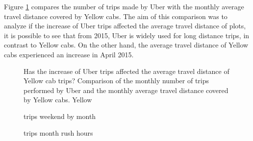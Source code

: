 Figure \ref{fig:boxDistances} compares the number of trips made by Uber with the monthly average travel distance covered by Yellow cabs. The aim of this comparison was to analyze if the increase of Uber trips affected the average travel distance of   plots, it is possible to see that from 2015, Uber is widely used for long distance trips, in contrast to Yellow cabs. On the other hand, the average travel distance of Yellow cabs experienced an increase in April 2015. 


\begin{figure}%
\centering
{}%
\qquad
{}%
\caption{Has the increase of Uber trips affected the average travel distance of Yellow cab trips? Comparison of the monthly number of trips performed by Uber and the monthly average travel distance covered by Yellow cabs. Yellow }
\label{fig:boxDistances}%
\end{figure}




\begin{figure}%
\centering
{}%
\qquad
{}%
\qquad
{}%
\qquad
{}%
\caption{trips weekend by month }
\label{fig:boxTrips}%
\end{figure}




\begin{figure}%
\centering
{}%
\qquad
{}%
\qquad
{}%
\qquad
{}%
\caption{trips month rush hours }
\label{fig:boxTrips}%
\end{figure}




